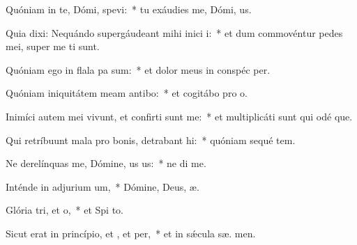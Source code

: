 \item Quóniam in te, Dómi, spevi:~* tu exáudies me, Dómi,  us.
\item Quia dixi: Nequándo supergáudeant mihi inici i:~* et dum commovéntur pedes mei, super me  ti sunt.
\item Quóniam ego in flala pa sum:~* et dolor meus in conspéc  per.
\item Quóniam iniquitátem meam antibo:~* et cogitábo pro  o.
\item Inimíci autem mei vivunt, et confirti sunt  me:~* et multiplicáti sunt qui odé  que.
\item Qui retríbuunt mala pro bonis, detrabant hi:~* quóniam sequé tem.
\item Ne derelínquas me, Dómine, us us:~* ne di  me.
\item Inténde in adjurium um,~* Dómine, Deus,  æ.
\item Glória tri, et o,~* et Spi to.
\item Sicut erat in princípio, et , et per,~* et in sǽcula sæ. men.
